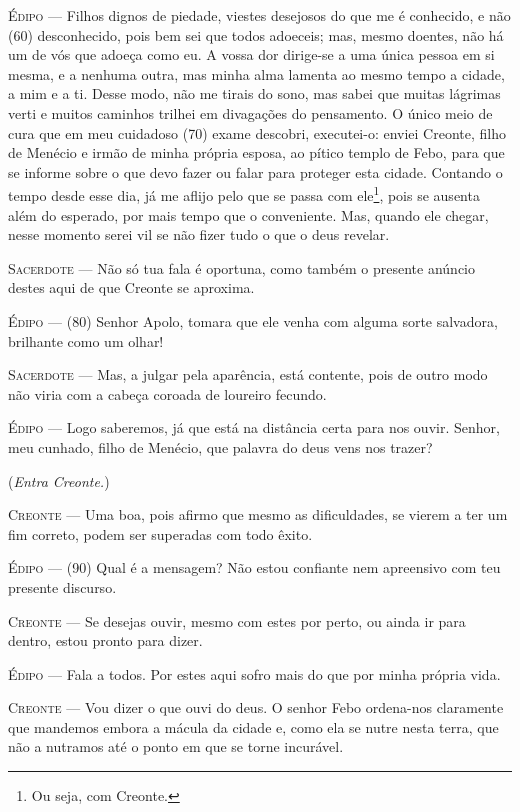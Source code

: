 \textsc{Édipo} --- Filhos dignos de piedade, viestes desejosos do que me é conhecido, e não
(60) desconhecido, pois bem sei que todos adoeceis; mas, mesmo doentes,
não há um de vós que adoeça como eu. A vossa dor dirige-se a uma única
pessoa em si mesma, e a nenhuma outra, mas minha alma lamenta ao mesmo
tempo a cidade, a mim e a ti. Desse modo, não me tirais do sono, mas
sabei que muitas lágrimas verti e muitos caminhos trilhei em divagações
do pensamento. O único meio de cura que em meu cuidadoso (70) exame
descobri, executei-o: enviei Creonte, filho de Menécio e irmão de minha
própria esposa, ao pítico templo de Febo, para que se informe sobre o
que devo fazer ou falar para proteger esta cidade. Contando o tempo
desde esse dia, já me aflijo pelo que se passa com ele\footnote{Ou seja,
  com Creonte.}, pois se ausenta além do esperado, por mais tempo que o
conveniente. Mas, quando ele chegar, nesse momento serei vil se não
fizer tudo o que o deus revelar.

\textsc{Sacerdote} --- Não só tua fala é oportuna, como também o presente anúncio destes aqui
de que Creonte se aproxima.

\textsc{Édipo} --- (80) Senhor Apolo, tomara que ele venha com alguma sorte salvadora,
brilhante como um olhar!

\textsc{Sacerdote} --- Mas, a julgar pela aparência, está contente, pois de outro modo não
viria com a cabeça coroada de loureiro fecundo.

\textsc{Édipo} --- Logo saberemos, já que está na distância certa para nos ouvir. Senhor,
meu cunhado, filho de Menécio, que palavra do deus vens nos trazer?

(\emph{Entra Creonte.})

\textsc{Creonte} --- Uma boa, pois afirmo que mesmo as dificuldades, se vierem a ter um fim
correto, podem ser superadas com todo êxito.

\textsc{Édipo} --- (90) Qual é a mensagem? Não estou confiante nem apreensivo com teu
presente discurso.

\textsc{Creonte} --- Se desejas ouvir, mesmo com estes por perto, ou ainda ir para dentro,
estou pronto para dizer.

\textsc{Édipo} --- Fala a todos. Por estes aqui sofro mais do que por minha própria vida.

\textsc{Creonte} --- Vou dizer o que ouvi do deus. O senhor Febo ordena-nos claramente que
mandemos embora a mácula da cidade e, como ela se nutre nesta terra, que
não a nutramos até o ponto em que se torne incurável.

